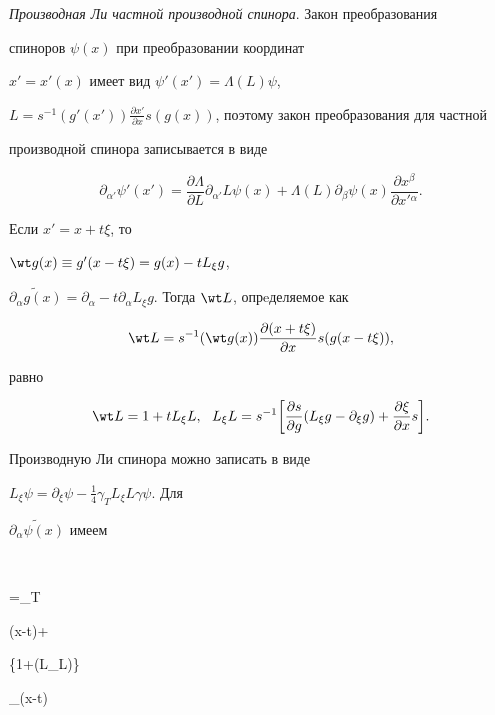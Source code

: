 {\it Производная Ли частной производной спинора}. Закон преобразования 


спиноров $\psi(x)$ при преобразовании координат


$x'=x'(x)$ имеет вид $\psi'(x')=\Lambda(L)\psi$,


$L=s^{-1}(g'(x'))\frac{\partial x'}{\partial x}


s(g(x))$, поэтому закон преобразования для частной


производной спинора записывается в виде


$$


\partial_{\alpha'}\psi'(x')=\frac{\partial \Lambda}


{\partial L} \partial _{\alpha'}L\psi(x)+


\Lambda(L)\partial_\beta\psi(x)


\frac{\partial x^\beta}{\partial x'{}^\alpha}.


$$


Если $x'=x+t\xi$, то


$\wt g(x)\equiv g'(x-t\xi)=g(x)-tL_\xi g$,


$\widetilde {\partial_\alpha g(x)}=\partial_\alpha-t


\partial_\alpha L_\xi g$. Тогда $\wt L$, опрeделяемое как


$$


\wt L=s^{-1}(\wt g(x))\frac{\partial (x+t\xi)}{\partial x}s(g(x-t\xi)),


$$


равно


$$


\wt L=1+t L_\xi L,\ \ L_\xi L=s^{-1}\bigg[


\frac{\partial s}{\partial g}(L_\xi g-\partial_\xi g)+


\frac{\partial \xi}{\partial x}s\bigg].


$$


Производную Ли спинора можно записать в виде


$L_\xi\psi=\partial_\xi\psi-\frac{1}{4}\gamma_TL_\xi L\gamma \psi$. Для


$\widetilde{ \partial_\alpha \psi(x)}$ имеем


$$


=\gamma_T


 \gamma\psi(x-t\xi)+


\bigg\{1+\bigg(L_\xi L\bigg)\gamma\bigg\}


\partial_\beta\psi(x-t\xi)


